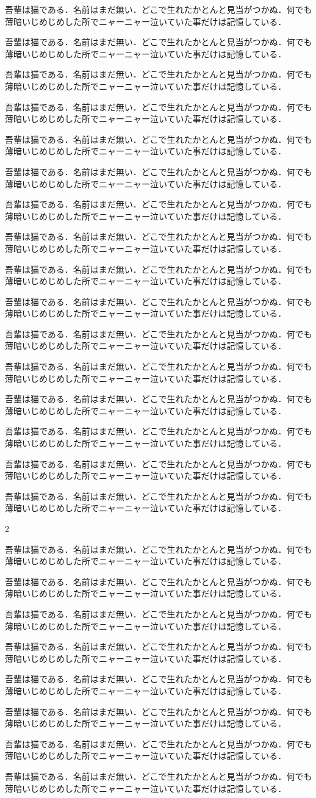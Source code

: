 \documentclass[twocolumn,paper=a4,fontsize=10pt]{jlreq}
\newcommand\para{吾輩は猫である．名前はまだ無い．どこで生れたかとんと見当がつかぬ．何でも薄暗いじめじめした所でニャーニャー泣いていた事だけは記憶している．\par}
\begin{document}
\para\para\para\para\para\para\para\para\para\para\para\para\para\para\para\para
\begin{spanfigure}[t]{2}
\centering\fbox{\rule{0pt}{180pt}\rule{200pt}{0pt}}
\caption{2段にまたがる図}
\end{spanfigure}
\para\para\para\para
{}
\para\para\para\para
\end{document}
